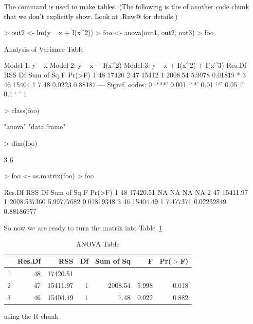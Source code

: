 \documentclass[12pt]{article}
\begin{document}
The \verb@xtable@ command is used to make tables.  (The following
is the \verb@Sweave@ of another code chunk that we don't explicitly
show.  Look at \verb@foo.Rnw@ for details.)
\begin{Schunk}
\begin{Sinput}
> out2 <- lm(y ~ x + I(x^2))
> foo <- anova(out1, out2, out3)
> foo
\end{Sinput}
\begin{Soutput}
Analysis of Variance Table

Model 1: y ~ x
Model 2: y ~ x + I(x^2)
Model 3: y ~ x + I(x^2) + I(x^3)
  Res.Df   RSS Df Sum of Sq      F  Pr(>F)  
1     48 17420                              
2     47 15412  1   2008.54 5.9978 0.01819 *
3     46 15404  1      7.48 0.0223 0.88187  
---
Signif. codes:  0 ‘***’ 0.001 ‘**’ 0.01 ‘*’ 0.05 ‘.’ 0.1 ‘ ’ 1 
\end{Soutput}
\begin{Sinput}
> class(foo)
\end{Sinput}
\begin{Soutput}
[1] "anova"      "data.frame"
\end{Soutput}
\begin{Sinput}
> dim(foo)
\end{Sinput}
\begin{Soutput}
[1] 3 6
\end{Soutput}
\begin{Sinput}
> foo <- as.matrix(foo)
> foo
\end{Sinput}
\begin{Soutput}
  Res.Df      RSS Df   Sum of Sq          F     Pr(>F)
1     48 17420.51 NA          NA         NA         NA
2     47 15411.97  1 2008.537360 5.99777682 0.01819348
3     46 15404.49  1    7.477371 0.02232849 0.88186977
\end{Soutput}
\end{Schunk}
So now we are ready to turn the matrix \verb@foo@
into Table~\ref{tab:one}
\begin{table}[tbp]
\begin{center}
\caption{ANOVA Table}
\label{tab:one}
\begin{tabular}{rrrrrrr}
  \hline
 & Res.Df & RSS & Df & Sum of Sq & F & Pr($>$F) \\ 
  \hline
1 & 48 & 17420.51 &  &  &  &  \\ 
  2 & 47 & 15411.97 & 1 & 2008.54 & 5.998 & 0.018 \\ 
  3 & 46 & 15404.49 & 1 & 7.48 & 0.022 & 0.882 \\ 
   \hline
\end{tabular}
\end{center}
\end{table}using the R chunk
\end{document}
